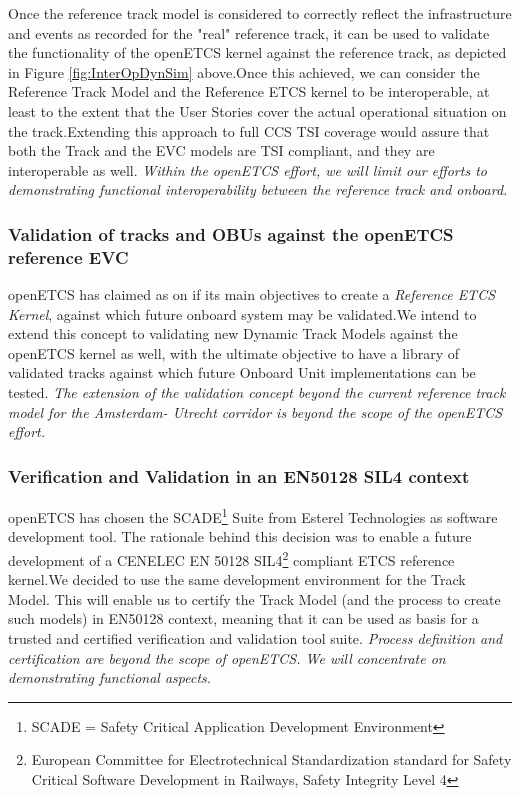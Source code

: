 \documentclass{template/openetcs_article}
\begin{document}
Once the reference track model is considered to correctly reflect the infrastructure and events as recorded for the "real" reference track, it can be used to validate the functionality of the openETCS kernel against the reference track, as depicted in Figure \ref{fig:InterOpDynSim} above.\newline Once this achieved, we can consider the Reference Track Model and the Reference ETCS kernel to be interoperable, at least to the extent that the User Stories cover the actual operational situation on the track.\newline Extending this approach to full CCS TSI coverage would assure that both the Track and the EVC models are TSI compliant, and they are interoperable as well.\newline \newline
\emph{Within the openETCS effort, we will limit our efforts to demonstrating functional interoperability between the reference track and onboard.}


\subsubsection{Validation of tracks and OBUs against the openETCS reference EVC}

openETCS has claimed as on if its main objectives to create a \emph{Reference ETCS Kernel}, against which future onboard system may be validated.\newline We intend to extend this concept to validating new Dynamic Track Models against the openETCS kernel as well, with the ultimate objective to have a library of validated tracks against which future Onboard Unit implementations can be tested.\newline \newline
\emph{The extension of the validation concept beyond the current reference track model for the Amsterdam- Utrecht corridor is beyond the scope of the openETCS effort.}
 
\subsubsection{Verification and Validation in an EN50128 SIL4 context}

openETCS has chosen the SCADE\footnote{SCADE = Safety Critical Application Development Environment}  Suite from Esterel Technologies as software development tool. The rationale behind this decision was to enable a future development of a CENELEC EN 50128 SIL4\footnote{European Committee for Electrotechnical Standardization standard for Safety Critical Software Development in Railways, Safety Integrity Level 4} compliant ETCS reference kernel.\newline We decided to use the same development environment for the Track Model. This will enable us to certify the Track Model (and the process to create such models) in EN50128 context, meaning that it can be used as basis for a trusted and certified verification and validation tool suite.\newline \newline
\emph{Process definition and certification are beyond the scope of openETCS. We will concentrate on demonstrating functional aspects.}
\end{document}
